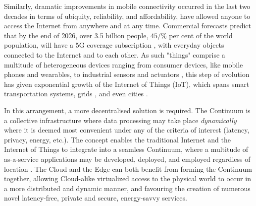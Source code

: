 Similarly, dramatic improvements in mobile connectivity occurred in the last two decades in terms of ubiquity, reliability, and affordability, have allowed anyone to access the Internet from anywhere and at any time.
Commercial forecasts predict that by the end of 2026,  over 3.5 billion people, $45$/\% per cent of the world population, will have a 5G coverage subscription \cite{ericsson-5g}, with everyday objects connected to the Internet and to each other. 
As such "things" comprise a multitude of heterogeneous devices ranging from consumer devices, like mobile phones and wearables, to industrial sensors and actuators \cite{chen2018edge}, this step of evolution has given exponential growth of the Internet of Things (IoT), which spans smart transportation systems, grids \cite{mugarza2019dynamic}, and even cities \textcolor{red}{\cite{mitton2012combining}}.

In this arrangement, a more decentralised solution is required. The Continuum is a collective infrastructure where data processing may take place \textit{dynamically} where it is deemed most convenient under any of the criteria of interest (latency, privacy, energy, etc.). The concept enables the traditional Internet and the Internet of Things to integrate into a seamless Continuum, where a multitude of as-a-service applications may be developed, deployed, and employed regardless of location \cite{beckman2020harnessing}. The Cloud and the Edge can both benefit from forming the Continuum together, allowing Cloud-alike virtualized access to the physical world to occur in a more distributed and dynamic manner, and favouring the creation of numerous novel latency-free, private and secure, energy-savvy services.

